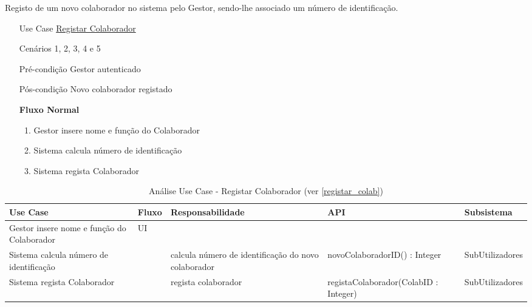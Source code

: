 \documentclass[../relatorio.tex]{subfiles}
\begin{document}
Registo de um novo colaborador no sistema pelo Gestor, sendo-lhe associado um número de identificação.
\begin{itemize}
    \item[Use Case] {\underline{Registar Colaborador}}
    \item[Cenários] {1, 2, 3, 4 e 5} 
    \item[Pré-condição] {Gestor autenticado}
    \item[Pós-condição] {Novo colaborador registado}
            \begin{flushleft}
                \textbf{Fluxo Normal}
            \end{flushleft}
            \begin{enumerate}
                \item Gestor insere nome e função do Colaborador
                \item Sistema calcula número de identificação
                \item Sistema regista Colaborador
            \end{enumerate}
\end{itemize}
\begin{landscape}
    \begin{table}[!h]
        \centering
        \begin{tabular}{|p{5cm}|p{1cm}|p{4cm}|p{6cm}|p{3cm}|}
            \hline
            \rowcolor{gray!20!white}
            Use Case & Fluxo                                            & Responsabilidade & API & Subsistema \\
            \hline
            \rowcolor{yellow}
            Gestor insere nome e função do Colaborador
                     & UI
                     & 
                     & 
                     & 
            \\
            \hline
            Sistema calcula número de identificação
                     & 
                     & calcula número de identificação do novo colaborador
                     & novoColaboradorID() : Integer
                     & SubUtilizadores
            \\
            \hline
            Sistema regista Colaborador
                     & 
                     & regista colaborador
                     & registaColaborador(ColabID : Integer)
                     & SubUtilizadores
            \\
            \hline
        \end{tabular}
        \caption{Análise Use Case - Registar Colaborador (ver \ref{registar_colab})}
    \end{table}
\end{landscape}
\end{document}

